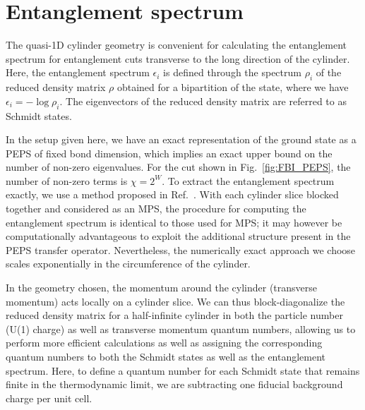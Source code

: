 
\newcommand{\uL}{\mathbf{L_0}}
\newcommand{\bL}{\mathbf{\bar{L}_0}}

\section{Entanglement spectrum}
\label{sec:ES}

The quasi-1D cylinder geometry is convenient for calculating the
entanglement spectrum for entanglement cuts transverse to the long direction of the
cylinder. Here, the entanglement spectrum $\epsilon_i$ is defined through the spectrum
$\rho_i$ of the reduced density matrix $\rho$ obtained for a bipartition of the state,
where we have $\epsilon_i = -\log \rho_i$.
The eigenvectors of the reduced density matrix are referred to as Schmidt
states.

In the setup given here, we have an exact representation of the ground state as a PEPS of
fixed bond dimension, which implies an exact upper bound on the number of non-zero eigenvalues.
For the cut shown in Fig.~\ref{fig:FBI_PEPS}, the number of non-zero terms is $\chi=2^W$.
To extract the entanglement spectrum exactly, we use a method proposed in Ref.~.
With each cylinder slice blocked together and considered as an MPS, the procedure for
computing the entanglement spectrum is identical to those used for MPS; it may however be
computationally advantageous to exploit the additional structure present in the PEPS transfer
operator. Nevertheless, the numerically exact approach we choose scales exponentially
in the circumference of the cylinder.

In the geometry chosen, the momentum around the cylinder (transverse momentum) acts
locally on a cylinder slice. We can thus block-diagonalize the reduced density matrix
for a half-infinite cylinder in both the particle number (U(1) charge) as well as transverse momentum
quantum numbers, allowing us to perform more efficient calculations as well as assigning
the corresponding quantum numbers to both the Schmidt states as well as the entanglement
spectrum. Here, to define a quantum
number for each Schmidt state that remains finite in the thermodynamic limit,
we are subtracting one fiducial background charge per unit cell.


